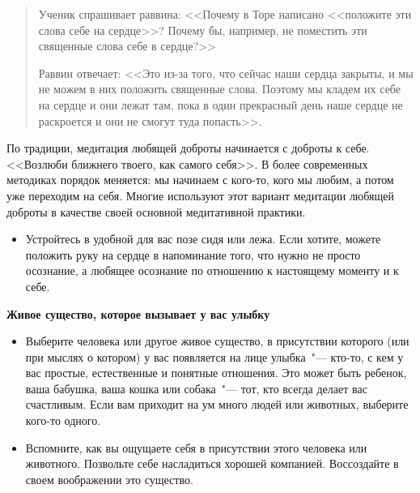 \begin{quotation}
	Ученик спрашивает раввина: <<Почему в Торе написано <<положите эти слова себе на сердце>>? Почему бы, например, не поместить эти священные слова себе в сердце?>>

	Раввин отвечает: <<Это из-за того, что сейчас наши сердца закрыты, и мы не можем в них положить священные слова. Поэтому мы кладем их себе на сердце и они лежат там, пока в один прекрасный день наше сердце не раскроется и они не смогут туда попасть>>.
\end{quotation}

\newpage
{} \label{M:Loving-Kindness_for_a_Loved_One}
По традиции, медитация любящей доброты начинается с доброты к себе. <<Возлюби ближнего твоего, как самого себя>>. В более современных методиках порядок меняется: мы начинаем с кого-то, кого мы любим, а потом уже переходим на себя. Многие используют этот вариант медитации любящей доброты в качестве своей основной медитативной практики.

\begin{itemize}
	\item Устройтесь в удобной для вас позе сидя или лежа. Если хотите, можете положить руку на сердце в напоминание того, что нужно не просто осознание, а любящее осознание по отношению к настоящему моменту и к себе. 
\end{itemize}

\vspace{3ex}

{\large \textbf{Живое существо, которое вызывает у вас улыбку}}
\begin{itemize}
	\item Выберите человека или другое живое существо, в присутствии которого (или при мыслях о котором) у вас появляется на лице улыбка~"--- кто-то, с кем у вас простые, естественные и понятные отношения. Это может быть ребенок, ваша бабушка, ваша кошка или собака~"--- тот, кто всегда делает вас счастливым. Если вам приходит на ум много людей или животных, выберите кого-то одного.
	
	\item Вспомните, как вы ощущаете себя в присутствии этого человека или животного. Позвольте себе насладиться хорошей компанией. Воссоздайте в своем воображении это существо.
\end{itemize}

\vspace{3ex}

